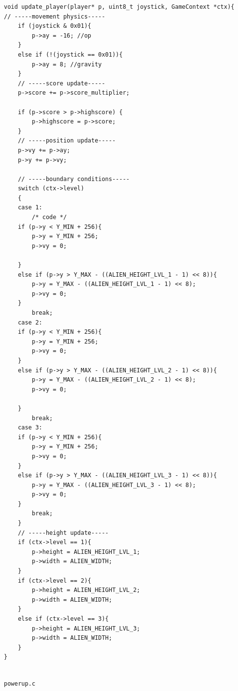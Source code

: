 \begin{lstlisting}
void update_player(player* p, uint8_t joystick, GameContext *ctx){
// -----movement physics-----
	if (joystick & 0x01){
		p->ay = -16; //op
	}
	else if (!(joystick == 0x01)){
		p->ay = 8; //gravity
	}
	// -----score update-----
	p->score += p->score_multiplier;
	
    if (p->score > p->highscore) {
        p->highscore = p->score;
    }
	// -----position update-----
	p->vy += p->ay;
	p->y += p->vy;

	// -----boundary conditions-----
	switch (ctx->level)
	{
	case 1:
		/* code */
	if (p->y < Y_MIN + 256){
		p->y = Y_MIN + 256;
		p->vy = 0;
		
	}
	else if (p->y > Y_MAX - ((ALIEN_HEIGHT_LVL_1 - 1) << 8)){
		p->y = Y_MAX - ((ALIEN_HEIGHT_LVL_1 - 1) << 8);
		p->vy = 0;
	}
		break;
	case 2:
	if (p->y < Y_MIN + 256){
		p->y = Y_MIN + 256;
		p->vy = 0;
	}
	else if (p->y > Y_MAX - ((ALIEN_HEIGHT_LVL_2 - 1) << 8)){
		p->y = Y_MAX - ((ALIEN_HEIGHT_LVL_2 - 1) << 8);
		p->vy = 0;
	
	}
		break;
	case 3:
	if (p->y < Y_MIN + 256){
		p->y = Y_MIN + 256;
		p->vy = 0;
	}
	else if (p->y > Y_MAX - ((ALIEN_HEIGHT_LVL_3 - 1) << 8)){
		p->y = Y_MAX - ((ALIEN_HEIGHT_LVL_3 - 1) << 8);
		p->vy = 0;
	}
		break;
	}
	// -----height update-----
	if (ctx->level == 1){
		p->height = ALIEN_HEIGHT_LVL_1;
		p->width = ALIEN_WIDTH;
	}
	if (ctx->level == 2){
		p->height = ALIEN_HEIGHT_LVL_2;
		p->width = ALIEN_WIDTH;
	}
	else if (ctx->level == 3){
		p->height = ALIEN_HEIGHT_LVL_3;
		p->width = ALIEN_WIDTH;
	}
}


\end{lstlisting}
\texttt{powerup.c}
